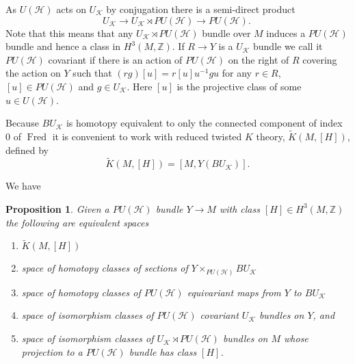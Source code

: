 \documentclass[a4paper,reqno]{amsart}
\DeclareMathOperator{\Fred}{Fred}
\theoremstyle{plain}
\newtheorem{proposition}[theorem]{Proposition}
\theoremstyle{definition}
\theoremstyle{remark}
\numberwithin{equation}{section}
\numberwithin{figure}{section}
\newcommand{\cH}{{\mathcal H}}
\newcommand{\ZZ}{{\mathbb Z}}
\newcommand{\redK}{\widetilde K} %
\newcommand{\UK}{U{_\mathcal K}}
\newcommand{\<}{\langle}
\renewcommand{\>}{\rangle}
\begin{document}
As $U(\cH)$ acts on $U_{\mathcal K}$ by conjugation there is
a semi-direct product
$$
U_{\mathcal K} \to U_{\mathcal K} \rtimes PU(\cH) \to PU(\cH).\
$$
Note that this means that any $ U_{\mathcal K} \rtimes PU(\cH)$
bundle over $M$ induces a $PU(\cH)$ bundle and hence a class
in $H^3(M, \ZZ)$.   If $R \to Y$ is a $U_{\mathcal K}$ bundle
we call it $PU(\cH)$ covariant if there is an action
of $PU(\cH)$ on the right of $R$ covering the action on $Y$ such that
$(rg)[u] = r[u] u^{-1}gu$ for any $r \in R$,
$[u] \in PU(\cH)$ and $g \in U_{\mathcal K}$. Here $[u]$ is the
projective class of some $u \in U(\cH)$.

Because $B\UK$ is homotopy equivalent to only the connected component
of index $0$ of $\Fred$ it is convenient to work with reduced twisted
$K$ theory, $\redK(M, [H])$, defined by
$$
\redK(M, [H]) = [M, Y(B\UK)].
$$


We have
\begin{proposition}
Given a $PU(\cH)$ bundle $Y \to M$ with class $[H] \in H^3(M, \ZZ)$ the
following are equivalent
spaces
\begin{enumerate}
\item $\redK(M, [H])$
\item space of homotopy classes of sections of $Y \times_{PU(\cH)}
BU{_\mathcal K}$
\item space of homotopy classes of  $PU(\cH)$ equivariant maps from $Y$ to
$BU{_\mathcal K}$
\item space of isomorphism classes of $PU(\cH)$ covariant $U{_\mathcal
K}$ bundles on $Y$, and
\item space of isomorphism classes of $U{_\mathcal K} \rtimes PU(\cH)$
bundles on $M$ whose projection to a $PU(\cH)$ bundle has class $[H]$.
\end{enumerate}
\end{proposition}
\end{document}
